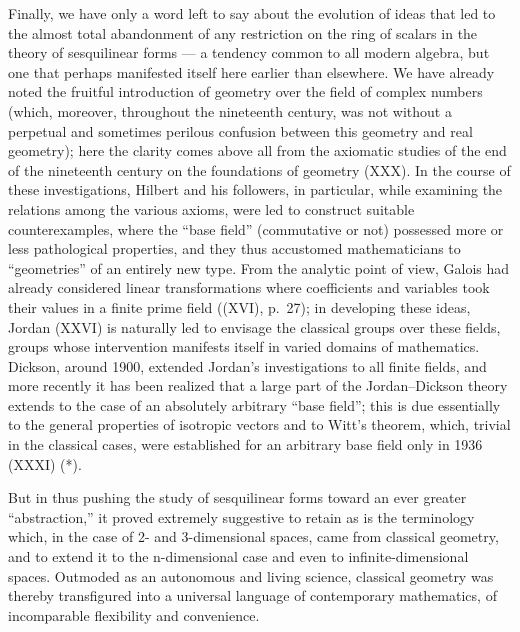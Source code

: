 Finally, we have only a word left to say about the evolution of ideas that led to the almost total abandonment of any restriction on the ring of scalars in the theory of sesquilinear forms — a tendency common to all modern algebra, but one that perhaps manifested itself here earlier than elsewhere. We have already noted the fruitful introduction of geometry over the field of complex numbers (which, moreover, throughout the nineteenth century, was not without a perpetual and sometimes perilous confusion between this geometry and real geometry); here the clarity comes above all from the axiomatic studies of the end of the nineteenth century on the foundations of geometry (XXX). In the course of these investigations, Hilbert and his followers, in particular, while examining the relations among the various axioms, were led to construct suitable counterexamples, where the “base field” (commutative or not) possessed more or less pathological properties, and they thus accustomed mathematicians to “geometries” of an entirely new type. From the analytic point of view, Galois had already considered linear transformations where coefficients and variables took their values in a finite prime field ((XVI), p.~27); in developing these ideas, Jordan (XXVI) is naturally led to envisage the classical groups over these fields, groups whose intervention manifests itself in varied domains of mathematics. Dickson, around 1900, extended Jordan's investigations to all finite fields, and more recently it has been realized that a large part of the Jordan–Dickson theory extends to the case of an absolutely arbitrary “base field”; this is due essentially to the general properties of isotropic vectors and to Witt's theorem, which, trivial in the classical cases, were established for an arbitrary base field only in 1936 (XXXI) (*).

But in thus pushing the study of sesquilinear forms toward an ever greater “abstraction,” it proved extremely suggestive to retain as is the terminology which, in the case of 2- and 3-dimensional spaces, came from classical geometry, and to extend it to the n-dimensional case and even to infinite-dimensional spaces. Outmoded as an autonomous and living science, classical geometry was thereby transfigured into a universal language of contemporary mathematics, of incomparable flexibility and convenience.

